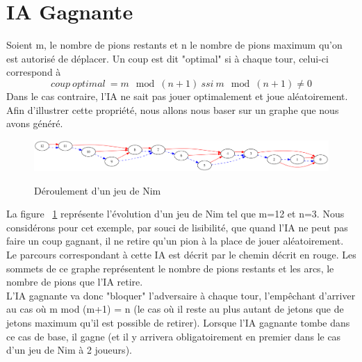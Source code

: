 \documentclass[10pt,a4paper]{article}
\begin{document}
\section{IA Gagnante}
Soient m, le nombre de pions restants et n le nombre de pions maximum qu'on est autorisé de déplacer. Un coup est dit "optimal" si à chaque tour, celui-ci correspond à \[coup \ optimal\ = m \mod (n+1)\ ssi\ m \mod (n+1) \neq 0 \]
Dans le cas contraire, l'IA ne sait pas jouer optimalement et joue aléatoirement.\\
Afin d'illustrer cette propriété, nous allons nous baser sur un graphe que nous avons généré.
\begin{figure}
\includegraphics[scale=0.2]{nim.png}
\label{nim12}
\caption{Déroulement d'un jeu de Nim}
\end{figure}
La figure ~\ref{nim12} représente l'évolution d'un jeu de Nim tel que m=12 et n=3. Nous considérons pour cet exemple, par souci de lisibilité, que quand l'IA ne peut pas faire un coup gagnant, il ne retire qu'un pion à la place de jouer aléatoirement. Le parcours correspondant à cette IA est décrit par le chemin décrit en {\color{red} rouge}. Les sommets de ce graphe représentent le nombre de pions restants et les arcs, le nombre de pions que l'IA retire. \\
L'IA gagnante va donc "bloquer" l'adversaire à chaque tour, l'empêchant d'arriver au cas  où m mod (m+1) = n (le cas où il reste au plus autant de jetons que de jetons maximum qu'il est possible de retirer). Lorsque l'IA gagnante tombe dans ce cas de base, il gagne (et il y arrivera obligatoirement en premier dans le cas d'un jeu de Nim à 2 joueurs).
\end{document}
